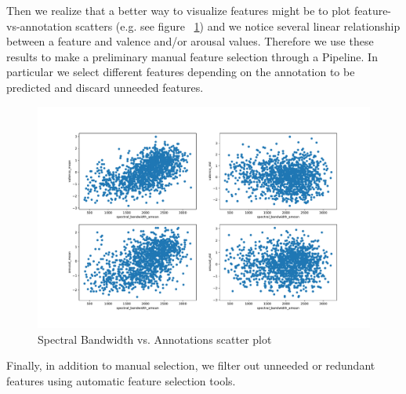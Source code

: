Then we realize that a better way to visualize features might be to plot feature-vs-annotation scatters (e.g. see figure ~\ref{fig:scatter-spectral_bandwidth_amean}) and we notice several linear relationship between a feature and valence and/or arousal values. Therefore we use these results to make a preliminary manual feature selection through a Pipeline. In particular we select different features depending on the annotation to be predicted and discard unneeded features.

\begin{figure}
	\centering
	\includegraphics[width=0.9\linewidth]{assets/scatter-spectral_bandwidth_amean.pdf}
	\caption{Spectral Bandwidth vs. Annotations scatter plot}
	\label{fig:scatter-spectral_bandwidth_amean}
\end{figure}

Finally, in addition to manual selection, we filter out unneeded or redundant features using automatic feature selection tools.